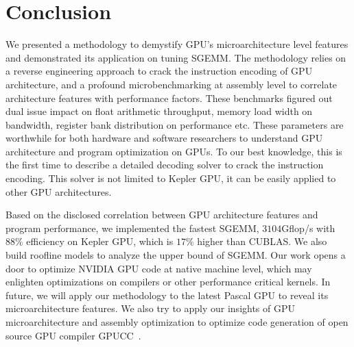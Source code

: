 \section{Conclusion}
\label{sec:conclusion}
We presented a methodology to demystify GPU's microarchitecture level features and demonstrated its 
application on tuning SGEMM. The methodology relies on a reverse engineering approach to crack the instruction encoding 
of GPU architecture, and a profound microbenchmarking at assembly level to correlate architecture features with 
performance factors. These benchmarks figured out dual issue impact on float arithmetic throughput, memory load width on bandwidth, register 
bank distribution on performance etc. These parameters are worthwhile for both hardware and software researchers to 
understand GPU architecture and program optimization on GPUs. To our best knowledge, this is the 
first time to describe a detailed decoding solver to crack the instruction encoding. 
This solver is not limited to Kepler GPU, it can be easily applied to other GPU architectures. 

Based on the disclosed correlation between GPU architecture features and program performance, we implemented the
fastest SGEMM,  $3104$Gflop/s with $88\%$ efficiency on Kepler GPU, which is $17\%$ higher than CUBLAS. 
We also build roofline models to analyze the upper bound of SGEMM.
Our work opens a door to optimize NVIDIA GPU code at native machine level, which may enlighten optimizations on
compilers or other performance critical kernels.
In future, we will apply our methodology to the latest Pascal GPU to reveal its microarchitecture features.
We also try to apply our insights of GPU microarchitecture and assembly optimization to optimize code generation of open source GPU compiler
GPUCC~\cite{wu2016gpucc}.
